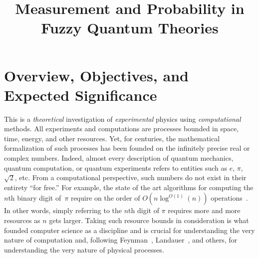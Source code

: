 \documentclass{article}
\title{Measurement and Probability in Fuzzy Quantum Theories}
\date{}
\theoremstyle{remark}
\begin{document}
\maketitle 

\section{Overview, Objectives, and Expected Significance} 

This is a \emph{theoretical} investigation of \emph{experimental}
physics using \emph{computational} methods. All experiments and
computations are processes bounded in space, time, energy, and other
resources. Yet, for centuries, the mathematical formalization of such
processes has been founded on the infinitely precise real or complex
numbers. Indeed, almost every description of quantum mechanics,
quantum computation, or quantum experiments refers to entities such as
$e$, $\pi$, $\sqrt{2}$, etc. From a computational perspective, such
numbers do not exist in their entirety ``for free.''  For example, the
state of the art algorithms for computing the $n$th binary digit of~$\pi$
require on the order of $O(n\log^{O(1)}(n))$
operations~\cite{journals/moc/BaileyBP97}. In other words, simply
referring to the $n$th digit of $\pi$ requires more and more resources
as $n$ gets larger. Taking such resource bounds in consideration is
what founded computer science as a discipline and is crucial for
understanding the very nature of computation and, following
Feynman~\cite{Feynman1982Simulating}, Landauer~\cite{Landauer1996188},
and others, for understanding the very nature of physical processes.
\end{document}
